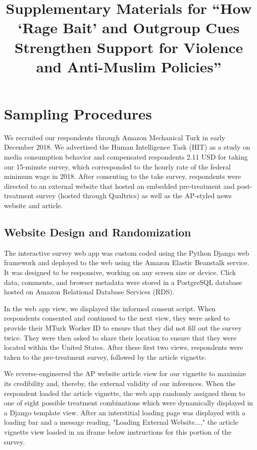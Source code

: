 \documentclass[]{article}
\title{\vspace{-4em}Supplementary Materials for ``How `Rage Bait' and Outgroup Cues Strengthen Support for Violence and Anti-Muslim Policies''}
\begin{document}
\maketitle 
\tableofcontents
\newpage
\setcounter{page}{1}
\section{Sampling Procedures}

We recruited our respondents through Amazon Mechanical Turk in early December 2018. We advertised the Human Intelligence Task (HIT) as a study on media consumption behavior and compensated respondents 2.11 USD for taking our 15-minute survey, which corresponded to the hourly rate of the federal minimum wage in 2018. After consenting to the take survey, respondents were directed to an external website that hosted an embedded pre-treatment and post-treatment survey (hosted through Qualtrics) as well as the AP-styled news website and article. 

\subsection{Website Design and Randomization}

The interactive survey web app was custom coded using the Python Django web framework and deployed to the web using the Amazon Elastic Beanstalk service. It was designed to be responsive, working on any screen size or device. Click data, comments, and browser metadata were stored in a PostgreSQL database hosted on Amazon Relational Database Services (RDS).

In the web app view, we displayed the informed consent script. When respondents consented and continued to the next view, they were asked to provide their MTurk Worker ID to ensure that they did not fill out the survey twice. They were then asked to share their location to ensure that they were located within the United States. After these first two views, respondents were taken to the pre-treatment survey, followed by the article vignette.

We reverse-engineered the AP website article view for our vignette to maximize its credibility and, thereby, the external validity of our inferences. When the respondent loaded the article vignette, the web app randomly assigned them to one of eight possible treatment combinations which were dynamically displayed in a Django template view. After an interstitial loading page was displayed with a loading bar and a message reading, "Loading External Website...," the article vignette view loaded in an iframe below instructions for this portion of the survey.
\end{document}
